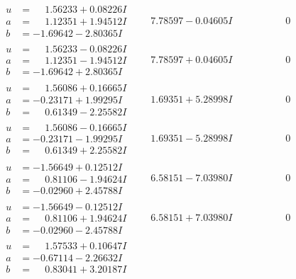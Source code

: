 \documentclass[1p]{elsarticle_modified}
\theoremstyle{definition}
\begin{document}
$$\begin{array}{c|c|c}
\begin{aligned}
u &= \phantom{-}1.56233 + 0.08226 I \\
a &= \phantom{-}1.12351 + 1.94512 I \\
b &= -1.69642 - 2.80365 I\end{aligned}
 & \phantom{-}7.78597 - 0.04605 I & \phantom{-0.000000 } 0 \\ \hline\begin{aligned}
u &= \phantom{-}1.56233 - 0.08226 I \\
a &= \phantom{-}1.12351 - 1.94512 I \\
b &= -1.69642 + 2.80365 I\end{aligned}
 & \phantom{-}7.78597 + 0.04605 I & \phantom{-0.000000 } 0 \\ \hline\begin{aligned}
u &= \phantom{-}1.56086 + 0.16665 I \\
a &= -0.23171 + 1.99295 I \\
b &= \phantom{-}0.61349 - 2.25582 I\end{aligned}
 & \phantom{-}1.69351 + 5.28998 I & \phantom{-0.000000 } 0 \\ \hline\begin{aligned}
u &= \phantom{-}1.56086 - 0.16665 I \\
a &= -0.23171 - 1.99295 I \\
b &= \phantom{-}0.61349 + 2.25582 I\end{aligned}
 & \phantom{-}1.69351 - 5.28998 I & \phantom{-0.000000 } 0 \\ \hline\begin{aligned}
u &= -1.56649 + 0.12512 I \\
a &= \phantom{-}0.81106 - 1.94624 I \\
b &= -0.02960 + 2.45788 I\end{aligned}
 & \phantom{-}6.58151 - 7.03980 I & \phantom{-0.000000 } 0 \\ \hline\begin{aligned}
u &= -1.56649 - 0.12512 I \\
a &= \phantom{-}0.81106 + 1.94624 I \\
b &= -0.02960 - 2.45788 I\end{aligned}
 & \phantom{-}6.58151 + 7.03980 I & \phantom{-0.000000 } 0 \\ \hline\begin{aligned}
u &= \phantom{-}1.57533 + 0.10647 I \\
a &= -0.67114 - 2.26632 I \\
b &= \phantom{-}0.83041 + 3.20187 I\end{aligned}

\end{array}$$
\end{document}
